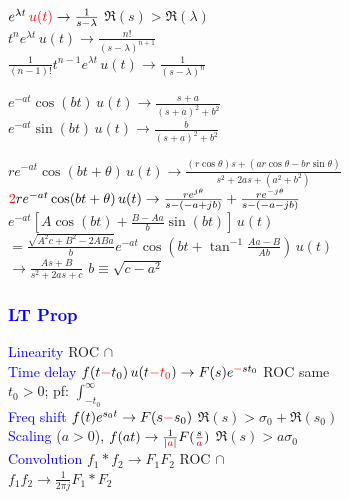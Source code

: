 \documentclass[4pt]{article}
\theoremstyle{definition}
\theoremstyle{definition}
\newcommand{\ra}{\rightarrow}
\newcommand{\red}[1]{\textcolor{red}{#1}}
\newcommand{\blue}[1]{\textcolor{blue}{#1}}
\begin{document}
\begin{landscape}
\begin{multicols}{3}
    \(e^{\lambda t} \, \red{u(t)} \ra \frac{1}{s \red - \lambda}\)      \hfill $\Re(s) > \Re(\lambda)$\\  
    \(t^n e^{\lambda t} \, u(t) \ra \frac{n!}{(s-\lambda)^{n+1}}\)\\     
    \(\frac{1}{(n-1)!} t^{n-1} e^{\lambda t} \, u(t) \ra \frac{1}{(s-\lambda)^n} \) 

    \(e^{-at} \cos (bt)\, u(t) \ra \frac{s+a}{(s+a)^2 + b^2}\)\\    
    \(e^{-at} \sin (bt)\, u(t) \ra \frac{b}{(s+a)^2 + b^2}\)    

    \(re^{-at} \cos(bt + \theta) \, u(t) \ra \frac{(r\cos\theta)s + (ar \cos\theta - br\sin \theta)}{s^2 + 2as + (a^2 + b^2)}\)\\
    \(\red{2} re^{-at} \cos(bt + \theta) \, u(t) \ra \frac{re^{j\theta}}{s-(-a+jb)}+\frac{re^{-j\theta}}{s-(-a-jb)}\)\\
    \(e^{-at}\left[A\cos(b t) + \frac{B-Aa}{b}\sin(bt)\right] \, u(t)\)\\
        \hspace{1em} \(= \frac{\sqrt{A^2c + B^2 - 2ABa}}{b}e^{-at}\cos\left(bt + \tan^{-1}\frac{Aa-B}{Ab}\right) \, u(t)\)\\
        \hspace{1em} \(\ra \frac{As+B}{s^2+2as+c}\)         \hfill \(b \equiv \sqrt{c-a^2}\)
\columnbreak
\subsubsection*{\blue{LT Prop}}
    \blue{Linearity}       \hfill ROC $\cap$\\
    \blue{Time delay} \(f(t \red - t_0) \, u(t \red{-t_0}) \ra F(s) e^{\red - st_0}\)     \hfill ROC same\\    %
        \hspace{1em} $t_0 > 0$; pf: \(\int_{-t_0}^{\infty}\)\\ 
    \blue{Freq shift} \(f(t) e^{s_0 t} \ra F(s\red - s_0)\)         \hfill $\Re(s) > \sigma_0 + \Re(s_0)$\\
    \blue{Scaling} ($a > 0$), \(f(at) \ra \frac{1}{|\red a|} F(\frac{s}{\red a})\)          \hfill $\Re(s) > a\sigma_0 $\\
    \blue{Convolution} \(f_1 * f_2 \ra F_1 F_2\) \hfill ROC $\cap$\\
        \hspace{1em} \(f_1 f_2 \ra \frac{1}{2\pi j} F_1 * F_2\)


\end{multicols}
\end{landscape}
\end{document}
